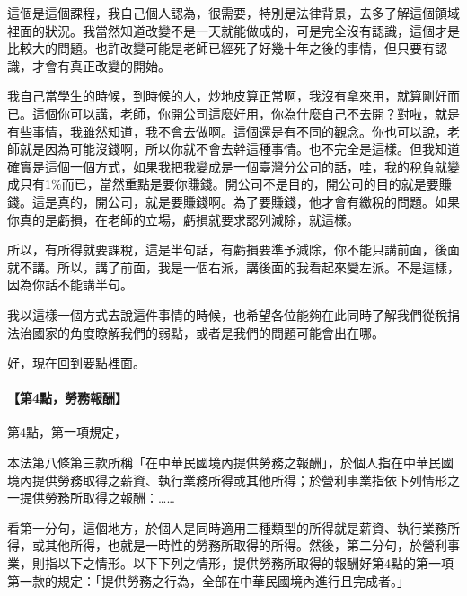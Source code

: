 \documentclass[oneside,sub3section]{ctexbook}
\let\oldparagraph\paragraph
\renewcommand{\paragraph}[1]{\oldparagraph{#1}\mbox{}}
\begin{document}
這個是這個課程，我自己個人認為，很需要，特別是法律背景，去多了解這個領域裡面的狀況。我當然知道改變不是一天就能做成的，可是完全沒有認識，這個才是比較大的問題。也許改變可能是老師已經死了好幾十年之後的事情，但只要有認識，才會有真正改變的開始。

我自己當學生的時候，到時候的人，炒地皮算正常啊，我沒有拿來用，就算剛好而已。這個你可以講，老師，你開公司這麼好用，你為什麼自己不去開？對啦，就是有些事情，我雖然知道，我不會去做啊。這個還是有不同的觀念。你也可以說，老師就是因為可能沒錢啊，所以你就不會去幹這種事情。也不完全是這樣。但我知道確實是這個一個方式，如果我把我變成是一個臺灣分公司的話，哇，我的稅負就變成只有1\%而已，當然重點是要你賺錢。開公司不是目的，開公司的目的就是要賺錢。這是真的，開公司，就是要賺錢啊。為了要賺錢，他才會有繳稅的問題。如果你真的是虧損，在老師的立場，虧損就要求認列減除，就這樣。

所以，有所得就要課稅，這是半句話，有虧損要準予減除，你不能只講前面，後面就不講。所以，講了前面，我是一個右派，講後面的我看起來變左派。不是這樣，因為你話不能講半句。

我以這樣一個方式去說這件事情的時候，也希望各位能夠在此同時了解我們從稅捐法治國家的角度瞭解我們的弱點，或者是我們的問題可能會出在哪。

好，現在回到要點裡面。

\hypertarget{ux7b2c4ux9edeux52deux52d9ux5831ux916c}{%
\paragraph{【第4點，勞務報酬】}\label{ux7b2c4ux9edeux52deux52d9ux5831ux916c}}

第4點，第一項規定，

本法第八條第三款所稱「在中華民國境內提供勞務之報酬」，於個人指在中華民國境內提供勞務取得之薪資、執行業務所得或其他所得；於營利事業指依下列情形之一提供勞務所取得之報酬：\ldots\ldots{}

看第一分句，這個地方，於個人是同時適用三種類型的所得就是薪資、執行業務所得，或其他所得，也就是一時性的勞務所取得的所得。然後，第二分句，於營利事業，則指以下之情形。以下下列之情形，提供勞務所取得的報酬好第4點的第一項第一款的規定：「提供勞務之行為，全部在中華民國境內進行且完成者。」
\end{document}
